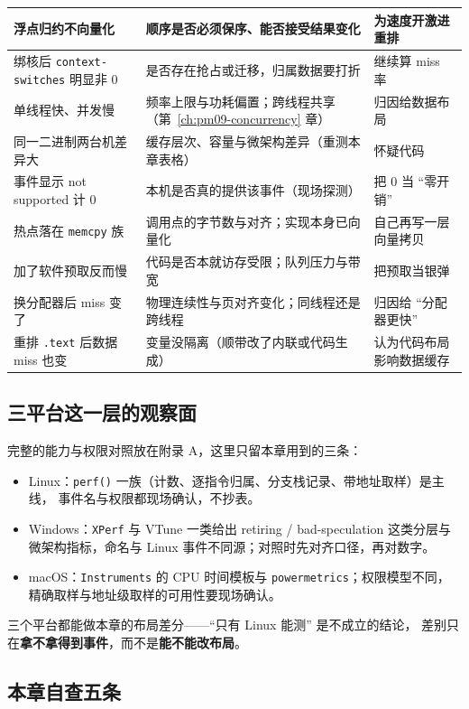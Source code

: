 \documentclass[12pt,a4paper,fontset=fandol]{ctexbook}
\newcommand{\Fn}[1]{\texttt{#1()}}
\newcommand{\Tp}[1]{\texttt{#1}}
\newcommand{\Bk}{\discretionary{}{}{}}
\newcommand{\Mx}[1]{\textsf{#1}}
\begin{document}
\begin{longtable}{|>{\raggedright\arraybackslash}p{}|>{\raggedright\arraybackslash}p{}|>{\raggedright\arraybackslash}p{}|}
\hline
浮点归约不向量化 & 顺序是否必须保序、能否接受结果变化 & 为速度开激进重排\\
\hline
绑核后 \Tp{context{\Bk}-switches} 明显非 0 & 是否存在抢占或迁移，归属数据要打折 & 继续算 miss 率\\
\hline
单线程快、并发慢 & 频率上限与功耗偏置；跨线程共享（第~\ref{ch:pm09-concurrency} 章） & 归因给数据布局\\
\hline
同一二进制两台机差异大 & 缓存层次、容量与微架构差异（重测本章表格） & 怀疑代码\\
\hline
事件显示 not supported 计 0 & 本机是否真的提供该事件（现场探测） & 把 0 当 ``零开销''\\
\hline
热点落在 \Tp{memcpy} 族 & 调用点的字节数与对齐；实现本身已向量化 & 自己再写一层向量拷贝\\
\hline
加了软件预取反而慢 & 代码是否本就访存受限；队列压力与带宽 & 把预取当银弹\\
\hline
换分配器后 miss 变了 & 物理连续性与页对齐变化；同线程还是跨线程 & 归因给 ``分配器更快''\\
\hline
重排 \Tp{.text} 后数据 miss 也变 & 变量没隔离（顺带改了内联或代码生成） & 认为代码布局影响数据缓存\\
\hline
\end{longtable}

\subsection{三平台这一层的观察面}

完整的能力与权限对照放在附录 A，这里只留本章用到的三条：
\begin{itemize}
\item Linux：\Fn{perf} 一族（计数、逐指令归属、分支栈记录、带地址取样）是主线，
  事件名与权限都现场确认，不抄表。
\item Windows：\Tp{XPerf} 与 VTune 一类给出 \Mx{retiring} / \Mx{bad{\Bk}-speculation} 这类分层与
  微架构指标，命名与 Linux 事件不同源；对照时先对齐口径，再对数字。
\item macOS：\Tp{Instruments} 的 CPU 时间模板与 \Tp{powermetrics}；权限模型不同，
  精确取样与地址级取样的可用性要现场确认。
\end{itemize}
三个平台都能做本章的布局差分——``只有 Linux 能测'' 是不成立的结论，
差别只在\textbf{拿不拿得到事件}，而不是\textbf{能不能改布局}。

\subsection{本章自查五条}
\end{document}

